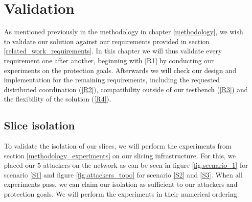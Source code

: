 \chapter{Validation}
\label{validation}

As mentioned previously in the methodology in chapter \ref{methodology}, we wish to validate our solution against our requirements provided in section \ref{related_work_requirements}. In this chapter we will thus validate every requirement one after another, beginning with \ref{R1} by conducting our experiments on the protection goals. Afterwards we will check our design and implementation for the remaining requirements, including the requested distributed coordination (\ref{R2}), compatibility outside of our testbench (\ref{R3}) and the flexibility of the solution (\ref{R4}).

\section{Slice isolation}
To validate the isolation of our slices, we will perform the experiments from section \ref{methodology_experiments} on our slicing infrastructure. For this, we placed our 5 attackers on the network as can be seen in figure \ref{fig:scenario_1} for scenario \ref{S1} and figure \ref{fig:attackers_topo} for scenario \ref{S2} and \ref{S3}. When all experiments pass, we can claim our isolation as sufficient to our attackers and protection goals.
We will perform the experiments in their numerical ordering.

